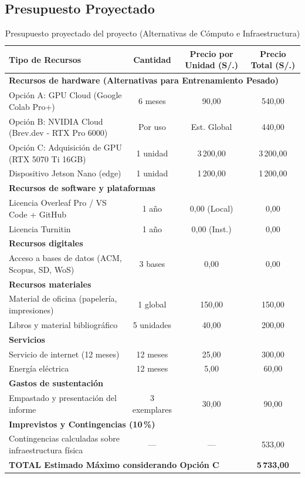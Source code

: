 \subsection{Presupuesto Proyectado}

\renewcommand{\arraystretch}{1.2}
\begin{table}[!htbp]
\centering
\caption{Presupuesto proyectado del proyecto (Alternativas de C\'omputo e Infraestructura)}
\label{tab:presupuesto}
\begin{tabularx}{\textwidth}{|X|c|c|c|}
\hline
\textbf{Tipo de Recursos} &
\textbf{Cantidad} &
\textbf{Precio por Unidad (S/.)} &
\textbf{Precio Total (S/.)} \\
\hline
\multicolumn{4}{|l|}{\textbf{Recursos de hardware (Alternativas para Entrenamiento Pesado)}} \\
\hline
Opci\'on A: GPU Cloud (Google Colab Pro+) & 6 meses & 90{,}00 & 540{,}00 \\
\hline
Opci\'on B: NVIDIA Cloud (Brev.dev - RTX Pro 6000) & Por uso & Est. Global & 440{,}00 \\
\hline
Opci\'on C: Adquisici\'on de GPU (RTX 5070 Ti 16GB) & 1 unidad & 3\,200{,}00 & 3\,200{,}00 \\
\hline
Dispositivo Jetson Nano (edge) & 1 unidad & 1\,200{,}00 & 1\,200{,}00 \\
\hline
\multicolumn{4}{|l|}{\textbf{Recursos de software y plataformas}} \\
\hline
Licencia Overleaf Pro / VS Code + GitHub & 1 a\~no & 0{,}00 (Local) & 0{,}00 \\
\hline
Licencia Turnitin & 1 a\~no & 0{,}00 (Inst.) & 0{,}00 \\
\hline
\multicolumn{4}{|l|}{\textbf{Recursos digitales}} \\
\hline
Acceso a bases de datos (ACM, Scopus, SD, WoS) & 3 bases & 0{,}00 & 0{,}00 \\
\hline
\multicolumn{4}{|l|}{\textbf{Recursos materiales}} \\
\hline
Material de oficina (papeler\'ia, impresiones) & 1 global & 150{,}00 & 150{,}00 \\
\hline
Libros y material bibliogr\'afico & 5 unidades & 40{,}00 & 200{,}00 \\
\hline
\multicolumn{4}{|l|}{\textbf{Servicios}} \\
\hline
Servicio de internet (12 meses) & 12 meses & 25{,}00 & 300{,}00 \\
\hline
Energ\'ia el\'ectrica & 12 meses & 5{,}00 & 60{,}00 \\
\hline
\multicolumn{4}{|l|}{\textbf{Gastos de sustentaci\'on}} \\
\hline
Empastado y presentaci\'on del informe & 3 exemplares & 30{,}00 & 90{,}00 \\
\hline
\multicolumn{4}{|l|}{\textbf{Imprevistos y Contingencias (10\,\%)}} \\
\hline
Contingencias calculadas sobre infraestructura f\'isica & --- & --- & 533{,}00 \\
\hline
\multicolumn{3}{|l|}{\textbf{TOTAL Estimado M\'aximo considerando Opci\'on C}} & \textbf{5\,733{,}00} \\
\hline
\end{tabularx}
\end{table}


